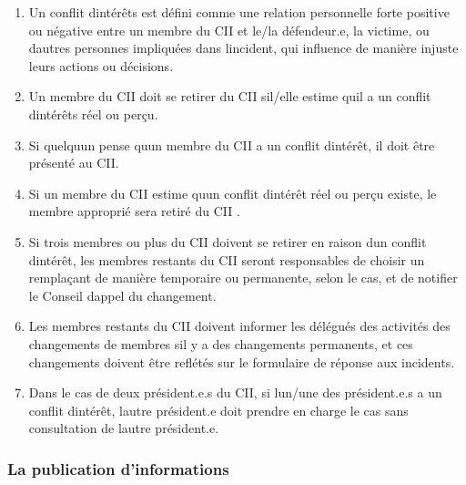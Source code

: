 \begin{enumerate}
 \item
  Un conflit d\textquotesingle intérêts est défini comme une relation personnelle forte positive ou négative entre un membre du CII et le/la défendeur.e, la victime, ou d\textquotesingle autres personnes impliquées dans l\textquotesingle incident, qui influence de manière injuste leurs actions ou décisions.
 \item
  Un membre du CII doit se retirer du CII s\textquotesingle il/elle estime qu\textquotesingle il a un conflit d\textquotesingle intérêts réel ou perçu.
 \item
  Si quelqu\textquotesingle un pense qu\textquotesingle un membre du CII a un conflit d\textquotesingle intérêt, il doit être présenté au CII.
 \item
  Si un membre du CII estime qu\textquotesingle un conflit d\textquotesingle intérêt réel ou perçu existe, le membre approprié sera retiré du CII .
 \item
  Si trois membres ou plus du CII doivent se retirer en raison d\textquotesingle un conflit d\textquotesingle intérêt, les membres restants du CII seront responsables de choisir un remplaçant de manière temporaire ou permanente, selon le cas, et de notifier le Conseil d\textquotesingle appel du changement.
 \item
  Les membres restants du CII doivent informer les délégués des activités des changements de membres s\textquotesingle il y a des changements permanents, et ces changements doivent être reflétés sur le formulaire de réponse aux incidents.
 \item
  Dans le cas de deux président.e.s du CII, si l\textquotesingle un/une des président.e.s a un conflit d\textquotesingle intérêt, l\textquotesingle autre président.e doit prendre en charge le cas sans consultation de l\textquotesingle autre président.e.
\end{enumerate}

\subsubsection{La publication d'informations}
\label{la-publication-dinformations}


